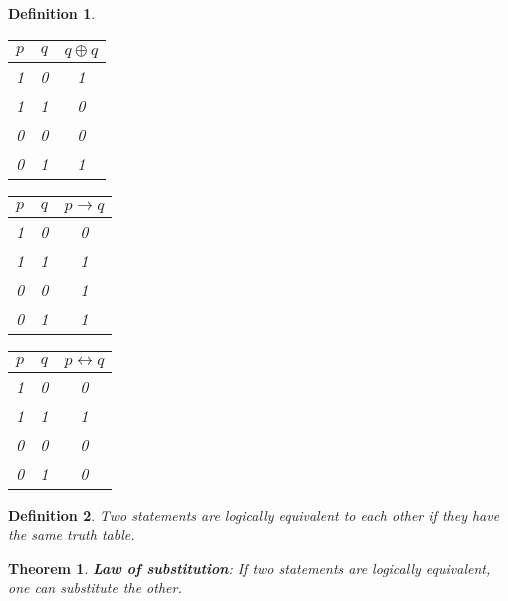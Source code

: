 \documentclass{article}
\newtheorem{definition}{Definition}
\newtheorem{thm}{Theorem}
\begin{document}
\begin{definition}
	\begin{tabular}{|c|c|c|}
		\hline 
		$p$ & $q$ & $q\oplus q$ \\ 
		\hline 
		1 & 0 & 1 \\ 
		\hline 
		1 & 1 & 0 \\ 
		\hline 
		0 & 0 & 0 \\ 
		\hline 
		0 & 1 & 1 \\ 
		\hline 
	\end{tabular}
	\quad
	\begin{tabular}{|c|c|c|}
		\hline 
		$p$ & $q$ & $p\to q$ \\ 
		\hline 
		1 & 0 & 0 \\ 
		\hline 
		1 & 1 & 1 \\ 
		\hline 
		0 & 0 & 1 \\ 
		\hline 
		0 & 1 & 1 \\ 
		\hline 
	\end{tabular} 
	\quad
	\begin{tabular}{|c|c|c|}
		\hline 
		$p$ & $q$ & $p\leftrightarrow q$ \\ 
		\hline 
		1 & 0 & 0 \\ 
		\hline 
		1 & 1 & 1 \\ 
		\hline 
		0 & 0 & 0 \\ 
		\hline 
		0 & 1 & 0 \\ 
		\hline 
	\end{tabular}   

\end{definition}

\begin{definition}
	Two statements are logically equivalent to each other if they have the same truth table. 
\end{definition}

\begin{thm}
	\textbf{Law of substitution}: If two statements are logically equivalent, one can substitute the other.
\end{thm}
\end{document}
